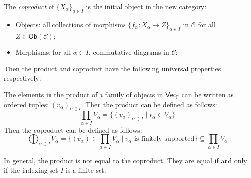 \documentclass[
	11pt, %
	fleqn, %
	a4paper, %
]{LegrandOrangeBook}
\newcommand{\F}{\mathbb{F}} %
\newcommand{\C}{\mathcal{C}} %
\newcommand{\Vect}{\boldsymbol{\mathsf{Vec}}} %
\newcommand{\Ob}[1]{\mathsf{Ob}(#1)} %
\DeclareRobustCommand{\coprod}{\mathop{\text{\fakecoprod}}}
\newcommand{\fakecoprod}{%
    \sbox0{$\prod$}%
    \smash{\raisebox{\dimexpr.9625\depth-\dp0}{\scalebox{1}[-1]{$\prod$}}}%
    \vphantom{$\prod$}%
}
\begin{document}
The \emph{coproduct} of $\{ X_{\alpha} \}_{\alpha \in I}$ is the initial object in the new category:
\begin{itemize}
    \item Objects: all collections of morphisms $\{ f_{\alpha} : X_{\alpha} \to Z \}_{\alpha \in I}$ in $\C$ for all $Z \in \Ob{\C}$;
    \item Morphisms: for all $\alpha \in I$, commutative diagrams in $\C$:
\end{itemize}
\begin{center}
\end{center}

Then the product and coproduct have the following universal properties respectively:
\begin{center}
    \qquad
\end{center}

The elements in the product of a family of objects in $\Vect_{\F}$ can be written as ordered tuples: $(v_\alpha)_{\alpha \in I}$. Then the product can be defined as follows:
\[
    \prod_{\alpha \in I} V_\alpha = \{ (v_\alpha)_{\alpha \in I} \mid v_\alpha \in V_\alpha \}
\]
Then the coproduct can be defined as follows:
\[
    \bigoplus_{\alpha \in I} V_\alpha = \{ (v_\alpha) \in \prod_{\alpha \in I} V_\alpha \mid v_\alpha \text{ is finitely supported} \} \subseteq \prod_{\alpha \in I} V_\alpha
\]

\begin{remark}
    In general, the product is not equal to the coproduct. They are equal if and only if the indexing set $I$ is a finite set.
\end{remark}
\end{document}
